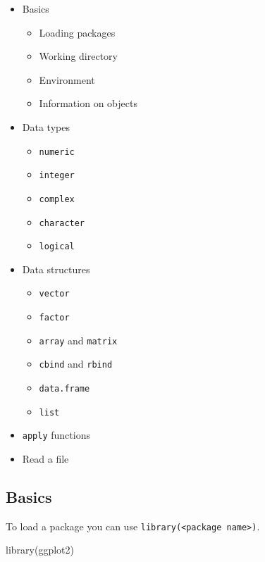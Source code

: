 \documentclass[
  letterpaper,
  DIV=11,
  numbers=noendperiod]{scrartcl}
\newenvironment{Shaded}{\begin{snugshade}}{\end{snugshade}}
\newcommand{\FunctionTok}[1]{\textcolor[rgb]{0.28,0.35,0.67}{#1}}
\newcommand{\NormalTok}[1]{\textcolor[rgb]{0.00,0.23,0.31}{#1}}
\providecommand{\tightlist}{%
  \setlength{\itemsep}{0pt}\setlength{\parskip}{0pt}}\usepackage{longtable,booktabs,array}
\begin{document}
\begin{itemize}
\tightlist
\item
  Basics

  \begin{itemize}
  \tightlist
  \item
    Loading packages
  \item
    Working directory
  \item
    Environment
  \item
    Information on objects
  \end{itemize}
\item
  Data types

  \begin{itemize}
  \tightlist
  \item
    \texttt{numeric}
  \item
    \texttt{integer}
  \item
    \texttt{complex}
  \item
    \texttt{character}
  \item
    \texttt{logical}
  \end{itemize}
\item
  Data structures

  \begin{itemize}
  \tightlist
  \item
    \texttt{vector}
  \item
    \texttt{factor}
  \item
    \texttt{array} and \texttt{matrix}
  \item
    \texttt{cbind} and \texttt{rbind}
  \item
    \texttt{data.frame}
  \item
    \texttt{list}
  \end{itemize}
\item
  \texttt{apply} functions
\item
  Read a file
\end{itemize}

\subsection{Basics}\label{basics}

To load a package you can use
\texttt{library(\textless{}package\ name\textgreater{})}.

\begin{Shaded}
\begin{Highlighting}[]
\FunctionTok{library}\NormalTok{(ggplot2)}
\end{Highlighting}
\end{Shaded}
\end{document}
